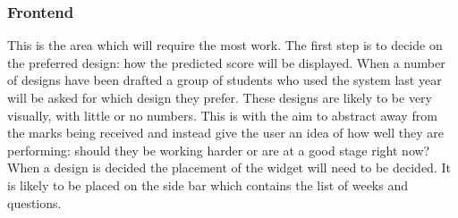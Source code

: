 \subsubsection{Frontend}
This is the area which will require the most work. The first step is to decide on the preferred design: how the predicted score will be displayed. When a number of designs have been drafted a group of students who used the system last year will be asked for which design they prefer. These designs are likely to be very visually, with little or no numbers. This is with the aim to abstract away from the marks being received and instead give the user an idea of how well they are performing: should they be working harder or are at a good stage right now?
\\
When a design is decided the placement of the widget will need to be decided. It is likely to be placed on the side bar which contains the list of weeks and questions.
